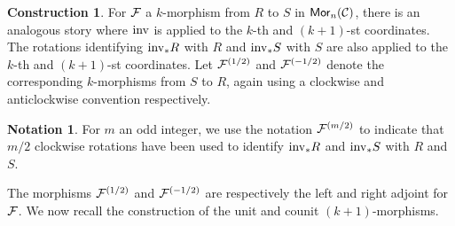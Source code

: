 \documentclass[10pt, reqno, twoside
, final
]{amsart}
\numberwithin{equation}{subsection}%
\theoremstyle{definition}
\theoremstyle{definition}
\theoremstyle{definition}
\newtheorem{nota}[defn]{Notation}
\theoremstyle{definition}
\newtheorem{cons}[defn]{Construction}
\theoremstyle{definition}
\theoremstyle{definition}
\theoremstyle{definition}
\theoremstyle{definition}
\theoremstyle{definition}
\theoremstyle{plain}
\theoremstyle{definition}
\theoremstyle{plain}
\theoremstyle{definition}
\theoremstyle{plain}
\theoremstyle{definition}
\theoremstyle{definition}
\theoremstyle{plain}
\theoremstyle{plain}
\theoremstyle{definition}
\theoremstyle{plain}
\theoremstyle{plain}
\theoremstyle{plain}
\begin{document}
\begin{cons}
For $\mathcal{F}$ a $k$-morphism from $R$ to $S$ in $\mathsf{Mor}_n(\mathcal{C})$, there is an analogous story where $\mathrm{inv}$ is applied to the $k$-th and $(k+1)$-st coordinates. The rotations identifying $\mathrm{inv}_*R$ with $R$ and $\mathrm{inv}_*S$ with $S$ are also applied to the $k$-th and $(k+1)$-st coordinates. Let $\mathcal{F}^{(1/2)}$  and $\mathcal{F}^{(-1/2)}$ denote the corresponding $k$-morphisms from $S$ to $R$, again using a clockwise and anticlockwise convention respectively.
\end{cons}

\begin{nota}
For $m$ an odd integer, we use the notation $\mathcal{F}^{(m/2)}$ to indicate that $m/2$ clockwise rotations have been used to identify $\mathrm{inv}_*R$ and $\mathrm{inv}_*S$ with $R$ and $S$. 
\end{nota}

The morphisms $\mathcal{F}^{(1/2)}$ and $\mathcal{F}^{(-1/2)}$ are respectively the left and right adjoint for $\mathcal{F}$. We now recall the construction of the unit and counit $(k+1)$-morphisms.
\end{document}
